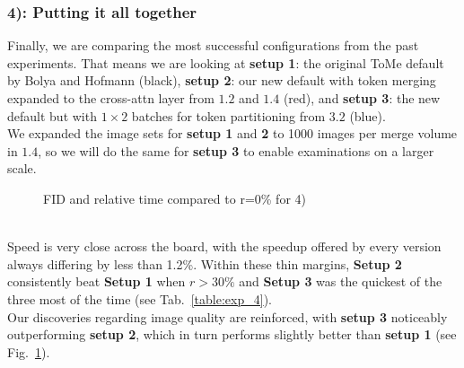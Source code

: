 \subsubsection*{4): Putting it all together}
Finally, we are comparing the most successful configurations from the past experiments. That means we are looking at \textbf{setup 1}: the original ToMe default by Bolya and Hofmann (black), \textbf{setup 2}: our new default with token merging expanded to the cross-attn layer from \(1.2\) and \(1.4\) (red), and \textbf{setup 3}: the new default but with $1 \times 2$ batches for token partitioning from \(3.2\) (blue).\\
We expanded the image sets for \textbf{setup 1} and \textbf{2} to 1000 images per merge volume in \(1.4\), so we will do the same for \textbf{setup 3} to enable examinations on a larger scale.
\begin{figure}[!htb]
    
    
\caption{FID and relative time compared to r=0\% for 4)}
\label{fig:exp_4}
\end{figure}\\
Speed is very close across the board, with the speedup offered by every version always differing by less than 1.2\%. Within these thin margins, \textbf{Setup 2} consistently beat \textbf{Setup 1} when \(r>30\%\) and \textbf{Setup 3} was the quickest of the three most of the time (see Tab.~\ref{table:exp_4}).\\
Our discoveries regarding image quality are reinforced, with \textbf{setup 3} noticeably outperforming \textbf{setup 2}, which in turn performs slightly better than \textbf{setup 1} (see Fig.~\ref{fig:exp_4}).



